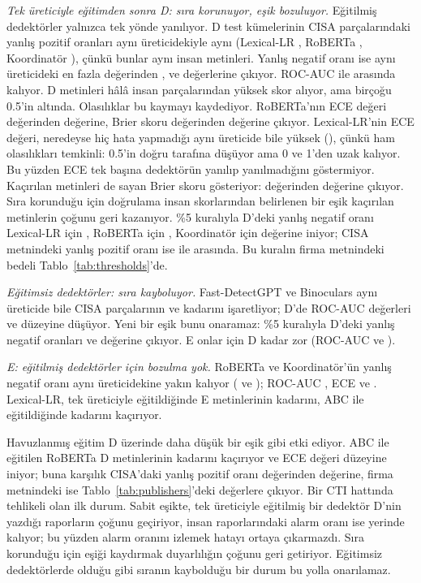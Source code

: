 \documentclass[journal]{IEEEtran}
\begin{document}
\emph{Tek üreticiyle eğitimden sonra D: sıra korunuyor, eşik bozuluyor.} Eğitilmiş dedektörler yalnızca tek yönde
yanılıyor. D test kümelerinin CISA parçalarındaki yanlış pozitif oranları aynı üreticidekiyle aynı (Lexical-LR
\NgDLexlrFpr{}, RoBERTa \NgDTransFpr{}, Koordinatör \NgDCoordFpr{}), çünkü bunlar aynı insan metinleri. Yanlış
negatif oranı ise aynı üreticideki en fazla \NgInLexlrFnr{} değerinden \NgDLexlrFnr{}, \NgDTransFnr{} ve
\NgDCoordFnr{} değerlerine çıkıyor. ROC-AUC \NgDLexlrRocAuc{} ile \NgDCoordRocAuc{} arasında kalıyor. D metinleri
hâlâ insan parçalarından yüksek skor alıyor, ama birçoğu 0.5'in altında. Olasılıklar bu kaymayı kaydediyor.
RoBERTa'nın ECE değeri \NgInTransEce{} değerinden \NgDTransEce{} değerine, Brier skoru \NgInTransBrier{} değerinden
\NgDTransBrier{} değerine çıkıyor. Lexical-LR'nin ECE değeri, neredeyse hiç hata yapmadığı aynı üreticide bile
yüksek (\NgInLexlrEce{}), çünkü ham olasılıkları temkinli: 0.5'in doğru tarafına düşüyor ama 0 ve 1'den uzak
kalıyor. Bu yüzden ECE tek başına dedektörün yanılıp yanılmadığını göstermiyor. Kaçırılan metinleri de sayan Brier
skoru gösteriyor: \NgInLexlrBrier{} değerinden \NgDLexlrBrier{} değerine çıkıyor. Sıra korunduğu için doğrulama
insan skorlarından belirlenen bir eşik kaçırılan metinlerin çoğunu geri kazanıyor. \%5 kuralıyla D'deki yanlış
negatif oranı Lexical-LR için \NgDLexlrFnrFive{}, RoBERTa için \NgDTransFnrFive{}, Koordinatör için
\NgDCoordFnrFive{} değerine iniyor; CISA metnindeki yanlış pozitif oranı ise \NgDLexlrFprFive{} ile
\NgDTransFprFive{} arasında. Bu kuralın firma metnindeki bedeli Tablo~\ref{tab:thresholds}'de.

\emph{Eğitimsiz dedektörler: sıra kayboluyor.} Fast-DetectGPT ve Binoculars aynı üreticide bile CISA parçalarının
\NgInFastFpr{} ve \NgInBinoFpr{} kadarını işaretliyor; D'de ROC-AUC değerleri \NgDFastRocAuc{} ve
\NgDBinoRocAuc{} düzeyine düşüyor. Yeni bir eşik bunu onaramaz: \%5 kuralıyla D'deki yanlış negatif oranları
\NgDFastFnrFive{} ve \NgDBinoFnrFive{} değerine çıkıyor. E onlar için D kadar zor (ROC-AUC \NgEFastRocAuc{} ve
\NgEBinoRocAuc{}).

\emph{E: eğitilmiş dedektörler için bozulma yok.} RoBERTa ve Koordinatör'ün yanlış negatif oranı aynı üreticidekine
yakın kalıyor (\NgETransFnr{} ve \NgECoordFnr{}); ROC-AUC \NgETransRocAuc{}, ECE \NgETransEce{} ve \NgECoordEce{}.
Lexical-LR, tek üreticiyle eğitildiğinde E metinlerinin \NgELexlrFnr{} kadarını, ABC ile eğitildiğinde
\NgEAbcLexlrFnr{} kadarını kaçırıyor.

Havuzlanmış eğitim D üzerinde daha düşük bir eşik gibi etki ediyor. ABC ile eğitilen RoBERTa D metinlerinin
\NgDAbcTransFnr{} kadarını kaçırıyor ve ECE değeri \NgDAbcTransEce{} düzeyine iniyor; buna karşılık CISA'daki yanlış
pozitif oranı \NgDTransFpr{} değerinden \NgDAbcTransFpr{} değerine, firma metnindeki ise Tablo~\ref{tab:publishers}'deki
değerlere çıkıyor. Bir CTI hattında tehlikeli olan ilk durum. Sabit eşikte, tek üreticiyle eğitilmiş bir dedektör
D'nin yazdığı raporların çoğunu geçiriyor, insan raporlarındaki alarm oranı ise yerinde kalıyor; bu yüzden alarm
oranını izlemek hatayı ortaya çıkarmazdı. Sıra korunduğu için eşiği kaydırmak duyarlılığın çoğunu geri getiriyor.
Eğitimsiz dedektörlerde olduğu gibi sıranın kaybolduğu bir durum bu yolla onarılamaz.
\end{document}
